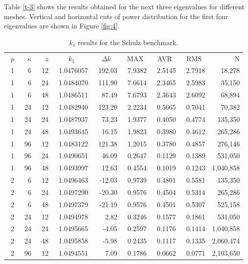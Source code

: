 \documentclass[runningheads,a4paper]{llncs}
\begin{document}
Table \ref{t-3} shows the results obtained for the next three eigenvalues for different meshes.
Vertical and horizontal cuts of power distribution for the first four eigenvalues are shown in Figure \ref{fig:4}.

\begin{table}[htp]
\caption{$k_1$ results for the Schulz benchmark.}
\label{t-2}
\begin{center}
\begin{tabular}{rrrrrrrrr}
\rowcolor{col1}
$p$ & $\kappa$ & $z$ &\multicolumn{1}{c}{$k_1$} & \multicolumn{1}{c}{$\Delta k$} & \multicolumn{1}{c}{MAX} & \multicolumn{1}{c}{AVR}& \multicolumn{1}{c}{RMS}& N \\
\rowcolor{col3}
~1& ~~6& ~12& ~1.0476057& ~192.03& ~7.9382& ~2.5145& ~2.7918& 18,278 \\
\rowcolor{col2}
1& 6& 24& 1.0484070& 111.90& 7.6614& 2.3465& 2.5983& 35,150 \\
\rowcolor{col1}
1& 6& 48& 1.0486511& 87.49& 7.6793& 2.3643& 2.6092& 68,894 \\
\rowcolor{col3}
1& 24& 12& 1.0482940& 123.20& 2.2234& 0.5665& 0.7041& 70,382 \\
\rowcolor{col3}
1& 24& 24& 1.0487937& 73.23& 1.9377& 0.4050& 0.4774& 135,350 \\
\rowcolor{col1}
1& 24& 48& 1.0493645& 16.15& 1.9823& 0.3980& 0.4612& 265,286\\
\rowcolor{col3}
1& 96& 12& 1.0483122& 121.38& 1.2015& 0.3780& 0.4857& 276,146\\
\rowcolor{col2}
1& 96& 24& 1.0490651& 46.09& 0.2647& 0.1129& 0.1389& 531,050\\
\rowcolor{col1}
1& 96& 48& 1.0493997& 12.63& 0.4554& 0.1019& 0.1243& 1,040,858\\
\rowcolor{col3}
2& 6& 12& 1.0496463& -12.03& 0.9739& 0.4801& 0.5581& 135,350\\
\rowcolor{green}
2& 6& 24& 1.0497290& -20.30& 0.9576& 0.4504& 0.5314& 265,286\\
\rowcolor{col1}
2& 6& 48& 1.0497379& -21.19& 0.9576& 0.4501& 0.5307& 525,158\\
\rowcolor{col3}
2& 24& 12& 1.0494978& 2.82& 0.3246& 0.1577& 0.1861& 531,050\\
\rowcolor{col2}
2& 24& 24& 1.0495665& -4.05& 0.2597& 0.1176& 0.1414& 1,040,858\\
\rowcolor{col1}
2& 24& 48& 1.0495858& -5.98& 0.2435& 0.1117& 0.1335& 2,060,474\\
\rowcolor{col3}
2& 96& 12& 1.0494551& 7.09& 0.1786& 0.0662& 0.0771& 2,103,650\\

\end{tabular}
\end{center}
\end{table}
\end{document}
